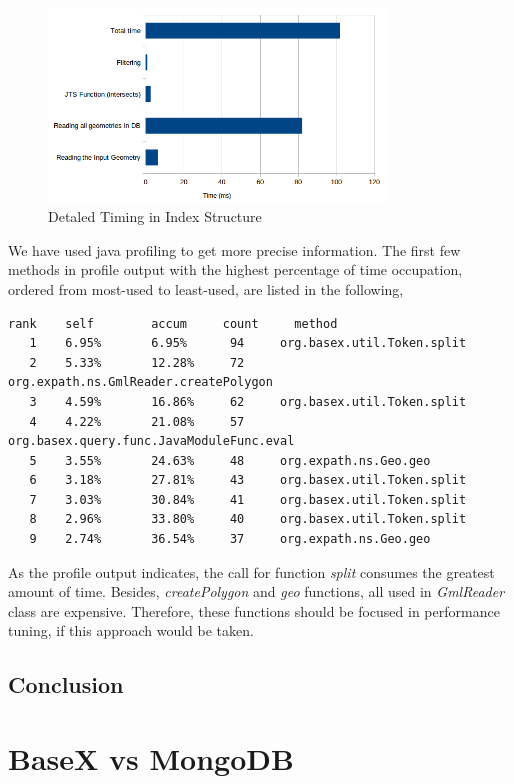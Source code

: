 \documentclass[a4paper,12pt]{article}
\begin{document}
\begin{figure}
\centering
\includegraphics[width=0.8\textwidth,height=0.25\textheight]{detailedTiming}
\caption{Detaled Timing in Index Structure}
\label{figDetailedTiming}
\end{figure}


We have used java profiling to get more precise information. The first few methods in profile output with the highest percentage of time occupation, ordered from most-used to least-used, are listed in the following,

\begin{verbatim}
rank   	self  		accum     count   	method
   1 	6.95%  		6.95%      94  	  org.basex.util.Token.split
   2  	5.33% 		12.28%     72 	  org.expath.ns.GmlReader.createPolygon
   3  	4.59% 		16.86%     62  	  org.basex.util.Token.split
   4  	4.22% 		21.08%     57  	  org.basex.query.func.JavaModuleFunc.eval
   5  	3.55% 		24.63%     48  	  org.expath.ns.Geo.geo
   6  	3.18% 		27.81%     43 	  org.basex.util.Token.split
   7 	3.03% 		30.84%     41  	  org.basex.util.Token.split
   8  	2.96% 		33.80%     40  	  org.basex.util.Token.split
   9  	2.74% 		36.54%     37  	  org.expath.ns.Geo.geo
\end{verbatim} 

As the profile output indicates, the call for function \textit{split} consumes the greatest amount of time. Besides, \textit{createPolygon} and \textit{geo} functions, all used in \textit{GmlReader} class are expensive. Therefore, these functions should be focused in performance tuning, if this approach would be taken.

\subsection{Conclusion}


\newpage
\section{BaseX vs MongoDB}
\label{s.mongo}
\end{document}
